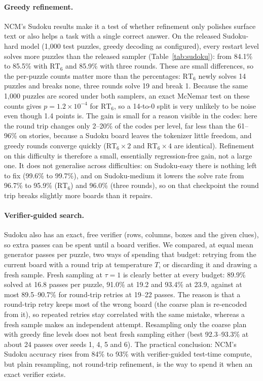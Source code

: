 \documentclass[10pt]{article}
\newcommand{\RT}[1]{\mathrm{RT}_{#1}}
\begin{document}
\paragraph{Greedy refinement.} NCM's Sudoku results \citep{kumbong2026ncm} make it a test of whether refinement only polishes surface text or also helps a task with a single correct answer. On the released Sudoku-hard model (1{,}000 test puzzles, greedy decoding as configured), every restart level solves more puzzles than the released sampler (Table~\ref{tab:sudoku}): from 84.1\% to 85.5\% with $\RT{6}$ and 85.9\% with three rounds. These are small differences, so the per-puzzle counts matter more than the percentages: $\RT{6}$ newly solves 14 puzzles and breaks none, three rounds solve 19 and break 1. Because the same 1{,}000 puzzles are scored under both samplers, an exact McNemar test on these counts gives $p{=}1.2\times10^{-4}$ for $\RT{6}$, so a 14-to-0 split is very unlikely to be noise even though 1.4 points is. The gain is small for a reason visible in the codes: here the round trip changes only 2--20\% of the codes per level, far less than the 61--96\% on stories, because a Sudoku board leaves the tokenizer little freedom, and greedy rounds converge quickly ($\RT{6}{\times}2$ and $\RT{6}{\times}4$ are identical). Refinement on this difficulty is therefore a small, essentially regression-free gain, not a large one. It does not generalise across difficulties: on Sudoku-easy there is nothing left to fix (99.6\% to 99.7\%), and on Sudoku-medium it lowers the solve rate from 96.7\% to 95.9\% ($\RT{6}$) and 96.0\% (three rounds), so on that checkpoint the round trip breaks slightly more boards than it repairs.

\paragraph{Verifier-guided search.} Sudoku also has an exact, free verifier (rows, columns, boxes and the given clues), so extra passes can be spent until a board verifies. We compared, at equal mean generator passes per puzzle, two ways of spending that budget: retrying from the current board with a round trip at temperature $T$, or discarding it and drawing a fresh sample. Fresh sampling at $\tau{=}1$ is clearly better at every budget: 89.9\% solved at 16.8 passes per puzzle, 91.0\% at 19.2 and 93.4\% at 23.9, against at most 89.5--90.7\% for round-trip retries at 19--22 passes. The reason is that a round-trip retry keeps most of the wrong board (the coarse plan is re-encoded from it), so repeated retries stay correlated with the same mistake, whereas a fresh sample makes an independent attempt. Resampling only the coarse plan with greedy fine levels does not beat fresh sampling either (best 92.3--93.3\% at about 24 passes over seeds 1, 4, 5 and 6). The practical conclusion: NCM's Sudoku accuracy rises from 84\% to 93\% with verifier-guided test-time compute, but plain resampling, not round-trip refinement, is the way to spend it when an exact verifier exists.
\end{document}
